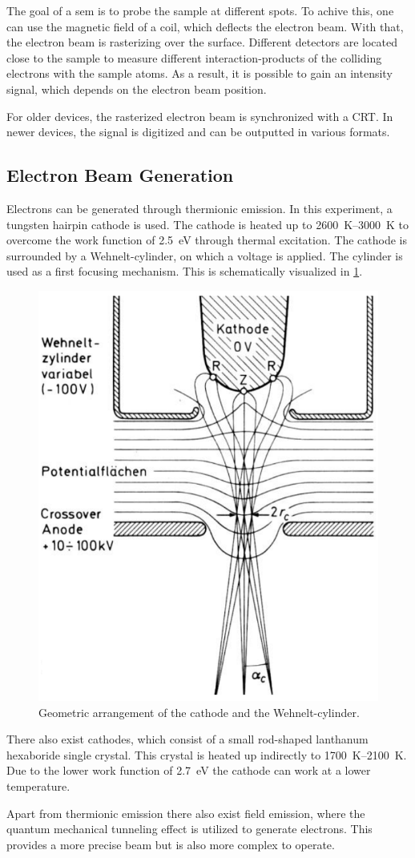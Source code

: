 The goal of a \ac{sem} is to probe the sample at different spots.
To achive this, one can use the magnetic field of a coil, which deflects
the electron beam. 
With that, the electron beam is rasterizing over the surface. 
Different detectors are located close to the sample to measure different 
interaction-products of the colliding electrons with the sample atoms. 
As a result, it is possible to gain an intensity signal, which
depends on the electron beam position.


For older devices, the rasterized electron beam is synchronized
with a CRT. 
In newer devices, the signal is digitized and can be outputted in
various formats. 

\subsection{Electron Beam Generation}
Electrons can be generated through thermionic emission.
In this experiment, a tungsten hairpin cathode is used.
The cathode is heated up to \qtyrange{2600}{3000}{\kelvin} to overcome
the work function of \qty{2.5}{\electronvolt} through thermal 
excitation.
The cathode is surrounded by a Wehnelt-cylinder, on which a voltage is 
applied.
The cylinder is used as a first focusing mechanism.
This is schematically visualized in \cref{fig:wolfram}. 
\begin{figure}[H]
	\centering
	\includegraphics[width=0.95\linewidth]{../assets/wolfram.png}
	\caption{Geometric arrangement of the cathode and the Wehnelt-cylinder.
	}
	\label{fig:wolfram}
\end{figure}
There also exist  cathodes, which consist of a small rod-shaped
lanthanum hexaboride single crystal. 
This crystal is heated up indirectly to \qtyrange{1700}{2100}{\kelvin}.
Due to the lower work function of \qty{2.7}{\electronvolt} the cathode
can work at a lower temperature. 

Apart from thermionic emission there also exist field emission, where
the quantum mechanical tunneling effect is utilized to generate electrons.
This provides a more precise beam but is also more complex to operate.

